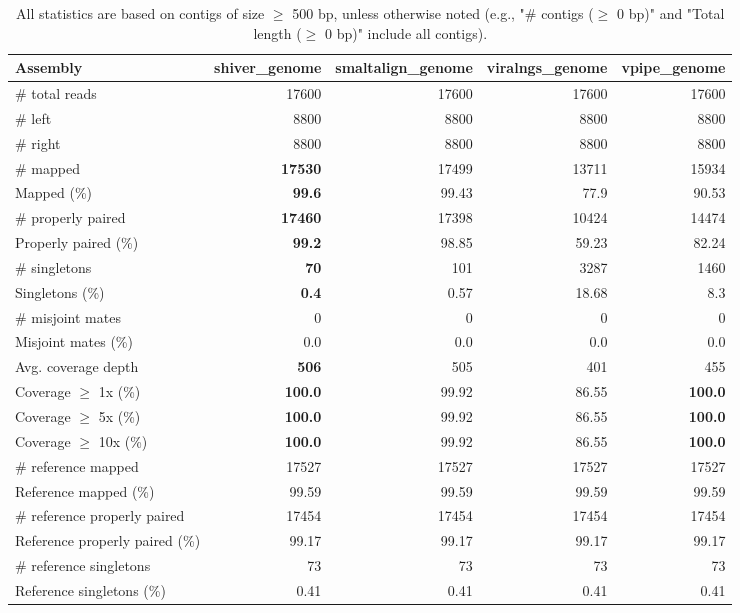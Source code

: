 \documentclass[12pt,a4paper]{article}
\begin{document}
\begin{table}[ht]
\begin{center}
\caption{All statistics are based on contigs of size $\geq$ 500 bp, unless otherwise noted (e.g., "\# contigs ($\geq$ 0 bp)" and "Total length ($\geq$ 0 bp)" include all contigs).}
\begin{tabular}{|l*{4}{|r}|}
\hline
Assembly & shiver\_genome & smaltalign\_genome & viralngs\_genome & vpipe\_genome \\ \hline
\# total reads & 17600 & 17600 & 17600 & 17600 \\ \hline
\# left & 8800 & 8800 & 8800 & 8800 \\ \hline
\# right & 8800 & 8800 & 8800 & 8800 \\ \hline
\# mapped & {\bf 17530} & 17499 & 13711 & 15934 \\ \hline
Mapped (\%) & {\bf 99.6} & 99.43 & 77.9 & 90.53 \\ \hline
\# properly paired & {\bf 17460} & 17398 & 10424 & 14474 \\ \hline
Properly paired (\%) & {\bf 99.2} & 98.85 & 59.23 & 82.24 \\ \hline
\# singletons & {\bf 70} & 101 & 3287 & 1460 \\ \hline
Singletons (\%) & {\bf 0.4} & 0.57 & 18.68 & 8.3 \\ \hline
\# misjoint mates & 0 & 0 & 0 & 0 \\ \hline
Misjoint mates (\%) & 0.0 & 0.0 & 0.0 & 0.0 \\ \hline
Avg. coverage depth & {\bf 506} & 505 & 401 & 455 \\ \hline
Coverage $\geq$ 1x (\%) & {\bf 100.0} & 99.92 & 86.55 & {\bf 100.0} \\ \hline
Coverage $\geq$ 5x (\%) & {\bf 100.0} & 99.92 & 86.55 & {\bf 100.0} \\ \hline
Coverage $\geq$ 10x (\%) & {\bf 100.0} & 99.92 & 86.55 & {\bf 100.0} \\ \hline
\# reference mapped & 17527 & 17527 & 17527 & 17527 \\ \hline
Reference mapped (\%) & 99.59 & 99.59 & 99.59 & 99.59 \\ \hline
\# reference properly paired & 17454 & 17454 & 17454 & 17454 \\ \hline
Reference properly paired (\%) & 99.17 & 99.17 & 99.17 & 99.17 \\ \hline
\# reference singletons & 73 & 73 & 73 & 73 \\ \hline
Reference singletons (\%) & 0.41 & 0.41 & 0.41 & 0.41 \\ \hline

\end{tabular}
\end{center}
\end{table}
\end{document}

